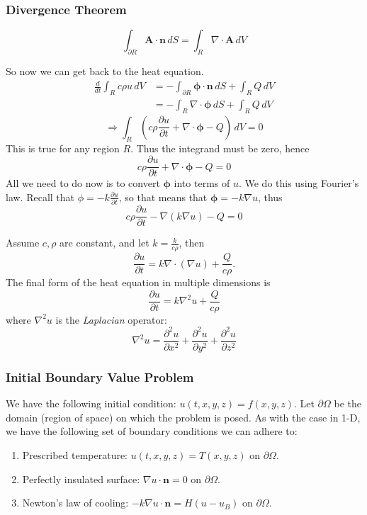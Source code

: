 \documentclass{article}
\begin{document}
	\subsubsection*{Divergence Theorem}
	\[
		\int_{\partial R} \mathbf{A} \cdot \mathbf{n} \, dS = \int_R \nabla \cdot \mathbf{A} \, dV
	\]

	So now we can get back to the heat equation.
	\begin{align*}
		\frac{d}{dt} \int_R c \rho u \, dV &= -\int_{\partial R} \bm{\phi} \cdot \mathbf{n} \, dS + \int_R Q \, dV \\
		&= -\int_R \nabla \cdot \bm{\phi} \, dS + \int_R Q \, dV
	\end{align*}
	\[
		\Rightarrow \int_R \left( c\rho \frac{\partial u}{\partial t} + \nabla \cdot \bm{\phi} - Q \right) \, dV = 0
	\]
	This is true for any region $ R $. Thus the integrand must be zero, hence
	\[
		c \rho \frac{\partial u}{\partial t} + \nabla \cdot \bm{\phi} - Q = 0
	\]
	All we need to do now is to convert $ \bm{\phi} $ into terms of $ u $. We do this using Fourier's law. Recall that $ \phi = -k\frac{\partial u}{\partial t} $, so that means that $ \bm{\phi} = -k\nabla u $, thus
	\[
		c \rho \frac{\partial u}{\partial t} - \nabla (k\nabla u) - Q = 0
	\]
	
	Assume $ c,\rho $ are constant, and let $ k = \frac{k}{c\rho} $, then
	\[
		\frac{\partial u}{\partial t} = k \nabla \cdot (\nabla u) + \frac{Q}{c\rho}.
	\]
	The final form of the heat equation in multiple dimensions is
	\[
		\frac{\partial u}{\partial t} = k \nabla^2u + \frac{Q}{c \rho}
	\]
	where $ \nabla^2 u $ is the \textit{Laplacian} operator:
	\[
	\nabla^2 u = \frac{\partial^2 u}{\partial x^2} + \frac{\partial^2 u}{\partial y^2} + \frac{\partial^2 u}{\partial z^2}
	\]
	
	\subsubsection*{Initial Boundary Value Problem}
	
	We have the following initial condition: $ u(t,x,y,z) = f(x,y,z) $. Let $ \partial \Omega $ be the domain (region of space) on which the problem is posed. As with the case in 1-D, we have the following set of boundary conditions we can adhere to:
	\begin{enumerate}[label=\arabic*.)]
		\item Prescribed temperature: $ u(t,x,y,z) = T(x,y,z) $ on $ \partial \Omega $.
		\item Perfectly insulated surface: $ \nabla u \cdot \mathbf{n} = 0 $ on $ \partial \Omega $.
		\item Newton's law of cooling: $ -k\nabla u \cdot \mathbf{n} = H(u-u_B) $ on $ \partial \Omega $.\\
	\end{enumerate}
\end{document}
